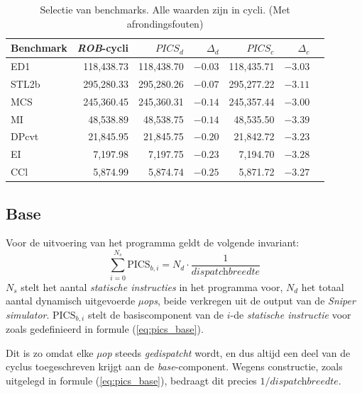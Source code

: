 \documentclass[12pt,a4paper,faculty=ea,language=nl]{ugent-doc}
\begin{document}
\begin{table}[H]
    \centering
    \begin{tabular}{lrrrrrr}
        \hline
        Benchmark & \textit{ROB}-cycli & \(PICS_d\) & \(\Delta_d\) & \(PICS_c\) & \(\Delta_c\) \\
        \hline
        ED1   & 118{,}438.73 & 118{,}438.70 & \(-0.03\) & 118{,}435.71 & \(-3.03\) \\
        STL2b & 295{,}280.33 & 295{,}280.26 & \(-0.07\) & 295{,}277.22 & \(-3.11\) \\
        MCS   & 245{,}360.45 & 245{,}360.31 & \(-0.14\) & 245{,}357.44 & \(-3.00\) \\
        MI    &  48{,}538.89 &  48{,}538.75 & \(-0.14\) &  48{,}535.50 & \(-3.39\) \\
        DPcvt &  21{,}845.95 &  21{,}845.75 & \(-0.20\) &  21{,}842.72 & \(-3.23\) \\
        EI    &   7{,}197.98 &   7{,}197.75 & \(-0.23\) &   7{,}194.70 & \(-3.28\) \\
        CCl   &   5{,}874.99 &   5{,}874.74 & \(-0.25\) &   5{,}871.72 & \(-3.27\) \\
        \hline
    \end{tabular}
    \caption{Selectie van benchmarks. Alle waarden zijn in cycli. (Met afrondingsfouten)}
    \label{tab:invariant_cycli}
\end{table}

\subsection{Base}
Voor de uitvoering van het programma geldt de volgende invariant:
\begin{equation}
\sum_{i=0}^{N_s} \text{PICS}_{b,i} = N_d \cdot \frac{1}{\textit{dispatchbreedte}}
\label{eq:pics_invariant}
\end{equation}
$N_s$ stelt het aantal \textit{statische instructies} in het programma voor, $N_d$ het totaal aantal dynamisch uitgevoerde \textit{µops}, beide verkregen uit de output van de \textit{Sniper simulator}. $\text{PICS}_{b,i}$ stelt de basiscomponent van de $i$-de \textit{statische instructie} voor zoals gedefinieerd in formule (\ref{eq:pics_base}).

Dit is zo omdat elke \textit{µop} steeds \textit{gedispatcht}  wordt, en dus altijd een deel van de cyclus toegeschreven krijgt aan de \textit{base}-component. Wegens constructie, zoals uitgelegd in formule (\ref{eq:pics_base}), bedraagt dit precies \(1/\textit{dispatchbreedte}\).
\end{document}
